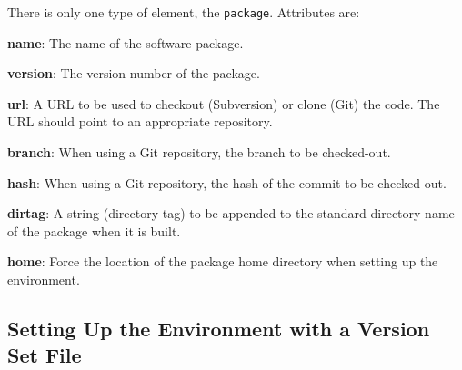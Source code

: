 \documentclass[12pt]{article}
\begin{document}
There is only one type of element, the {\tt package}. Attributes are:

\begin{description}
\item{\bf name}: The name of the software package.
\item{\bf version}: The version number of the package.
\item{\bf url}: A URL to be used to checkout (Subversion) or clone
  (Git) the code. The URL should point to an appropriate repository.
\item{\bf branch}: When using a Git repository, the branch to be
  checked-out.
\item{\bf hash}: When using a Git repository, the hash of the commit to be checked-out.
\item{\bf dirtag}: A string (directory tag) to be appended to the
  standard directory name of the package when it is built.
\item{\bf home}: Force the location of the package home directory when setting up the environment.
\end{description}

\subsection{Setting Up the Environment with a Version Set File}
\end{document}
